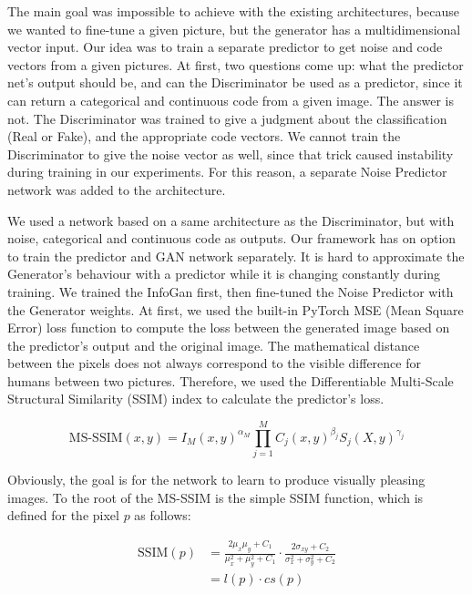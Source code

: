 \documentclass{egpubl}
\begin{document}
The main goal was impossible to achieve with the existing architectures, because we wanted to fine-tune a given picture, but the generator has a multidimensional vector input. Our idea was to train a separate predictor to get noise and code vectors from a given pictures. At first, two questions come up: what the predictor net’s output should be, and can the Discriminator be used as a predictor, since it can return a categorical and continuous code from a given image. The answer is not. The Discriminator was trained to give a judgment about the classification (Real or Fake), and the appropriate code vectors. We cannot train the Discriminator to give the noise vector as well, since that trick caused instability during training in our experiments. For this reason, a separate Noise Predictor network was added to the architecture.

We used a network based on a same architecture as the Discriminator, but with noise, categorical and continuous code as outputs. Our framework has on option to train the predictor and GAN network separately. It is hard to approximate the Generator's behaviour with a predictor while it is changing constantly during training. We trained the InfoGan first, then fine-tuned the Noise Predictor with the Generator weights. At first, we used the built-in PyTorch MSE (Mean Square Error) loss function to compute the loss between the generated image based on the predictor’s output and the original image. The mathematical distance between the pixels does not always correspond to the visible difference for humans between two pictures. Therefore, we used the Differentiable Multi-Scale Structural Similarity (SSIM) index to calculate the predictor’s loss.~\cite{zhao2015loss}

\begin{displaymath}
\mathrm{MS\mbox{-}SSIM}(x,y) = I_M(x,y)^{\alpha_M} \prod_{j=1}^{M} C_j(x,y)^{\beta_j}S_j(X,y)^{\gamma_j}
\end{displaymath}

Obviously, the goal is for the network to learn to produce visually pleasing images. To the root of the MS-SSIM is the simple SSIM function, which is defined for the pixel $p$ as follows:

\begin{equation}
\begin{aligned}
\mathrm{SSIM}(p) &= \frac{2\mu_x\mu_y + C_1}{\mu_x^2 + \mu_y^2 + C_1}\cdot\frac{2\sigma_{xy} + C_2}{\sigma_x^2 + \sigma_y^2 + C_2} \\ 
&= l(p)\cdot cs(p)
\end{aligned}
\end{equation}
\end{document}
